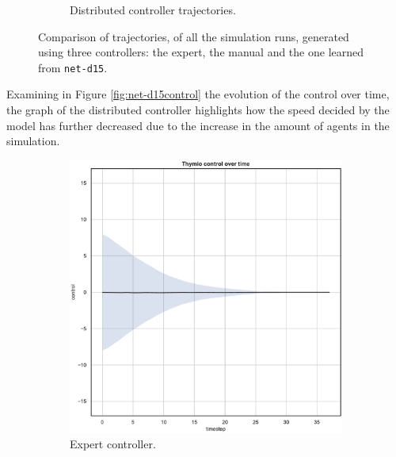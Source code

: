 \begin{figure}[!htb]
\begin{center}
\begin{subfigure}[h]{0.49\textwidth}
			\caption{Distributed controller trajectories.}
		\end{subfigure}
	\end{center}
	\caption[Evaluation of the trajectories learned by 
	\texttt{net-d15}.]{Comparison of trajectories, of all the simulation runs, 
	generated using three controllers: the expert, the manual and the one learned 
	from \texttt{net-d15}.}
	\label{fig:net-d15traj}
\end{figure}


Examining in Figure \ref{fig:net-d15control} the evolution of the control over 
time, the graph of the distributed controller highlights how the speed decided by 
the model has further decreased due to the increase in the amount of agents in 
the simulation.
\begin{figure}[!htb]
	\centering
	\begin{subfigure}[h]{0.3\textwidth}
		\centering
		\includegraphics[width=\textwidth]{contents/images/net-d15/control-overtime-omniscient}%
		\caption{Expert controller.}
	\end{subfigure}
	\hfill
	\begin{subfigure}[h]{0.3\textwidth}
		\centering

\end{subfigure}
\end{figure}
